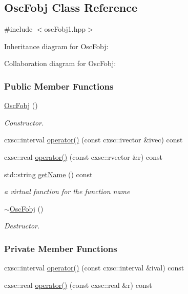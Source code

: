 \hypertarget{classOscFobj}{\subsection{\-Osc\-Fobj \-Class \-Reference}
\label{classOscFobj}
}


{\ttfamily \#include $<$osc\-Fobj1.\-hpp$>$}



\-Inheritance diagram for \-Osc\-Fobj\-:


\-Collaboration diagram for \-Osc\-Fobj\-:
\subsubsection*{\-Public \-Member \-Functions}
\begin{DoxyCompactItemize}
\item 
\hyperlink{classOscFobj_a515cee36fbccd4fbe8a2f707bef2c9d6}{\-Osc\-Fobj} ()
\begin{DoxyCompactList}\small\item\em \-Constructor. \end{DoxyCompactList}\item 
cxsc\-::interval \hyperlink{classOscFobj_a5e2d7abb22cc71e47be2d6f9b5acaa2c}{operator()} (const cxsc\-::ivector \&ivec) const 
\item 
cxsc\-::real \hyperlink{classOscFobj_abc13936e90daaa530f97eea20cb6b310}{operator()} (const cxsc\-::rvector \&r) const 
\item 
std\-::string \hyperlink{classOscFobj_a11fc8cb4baeded5b0b1e21d76250d0a4}{get\-Name} () const 
\begin{DoxyCompactList}\small\item\em a virtual function for the function name \end{DoxyCompactList}\item 
\hyperlink{classOscFobj_a9b1a0df6b1af480edf1a158e98f2cffe}{$\sim$\-Osc\-Fobj} ()
\begin{DoxyCompactList}\small\item\em \-Destructor. \end{DoxyCompactList}\end{DoxyCompactItemize}
\subsubsection*{\-Private \-Member \-Functions}
\begin{DoxyCompactItemize}
\item 
cxsc\-::interval \hyperlink{classOscFobj_abb34bbb89491d69889dfdbaf59ff97c5}{operator()} (const cxsc\-::interval \&ival) const 
\item 
cxsc\-::real \hyperlink{classOscFobj_a2472b4b74b761201ee2bfa7993a33392}{operator()} (const cxsc\-::real \&r) const 
\end{DoxyCompactItemize}
